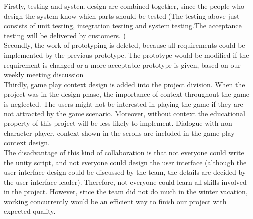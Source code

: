 \documentclass[12pt, a4paper]{report}
\begin{document}
		Firstly, testing and system design are combined together, since the people who design the system know which parts should be tested (The testing above just consists of unit testing, integration testing and system testing.The acceptance testing will be delivered by customers. )\\

		Secondly, the work of prototyping is deleted, because all requirements could be implemented by the previous prototype. The prototype would be modified if the requirement is changed or a more acceptable prototype is
		given, based on our weekly meeting discussion.\\

		Thirdly, game play context design is added into the project division. When the project was in the design phase, the importance of context throughout the game is neglected. The users might not be interested in playing the game if they are not attracted by the game scenario. Moreover, without context the educational property of this project will be less likely to implement. Dialogue with non-character player, context shown in the scrolls are included in the game play context design.\\ 

		
		The disadvantage of this kind of collaboration is that not everyone could write the unity script, and not everyone could design the user interface (although the user interface design could be discussed by the team, the details are decided by the user interface leader). Therefore, not everyone could learn all skills involved in the project. However, since the team did not do much in the winter vacation, working concurrently would be an efficient way to finish our project with expected quality.\\
		
\end{document}
